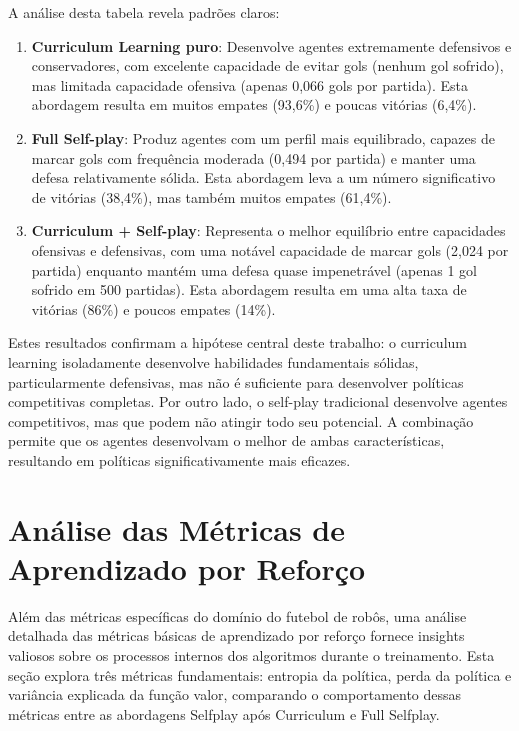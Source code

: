 A análise desta tabela revela padrões claros:

\begin{enumerate}
    \item \textbf{Curriculum Learning puro}: Desenvolve agentes extremamente defensivos e conservadores, com excelente capacidade de evitar gols (nenhum gol sofrido), mas limitada capacidade ofensiva (apenas 0,066 gols por partida). Esta abordagem resulta em muitos empates (93,6\%) e poucas vitórias (6,4\%).
    
    \item \textbf{Full Self-play}: Produz agentes com um perfil mais equilibrado, capazes de marcar gols com frequência moderada (0,494 por partida) e manter uma defesa relativamente sólida. Esta abordagem leva a um número significativo de vitórias (38,4\%), mas também muitos empates (61,4\%).
    
    \item \textbf{Curriculum + Self-play}: Representa o melhor equilíbrio entre capacidades ofensivas e defensivas, com uma notável capacidade de marcar gols (2,024 por partida) enquanto mantém uma defesa quase impenetrável (apenas 1 gol sofrido em 500 partidas). Esta abordagem resulta em uma alta taxa de vitórias (86\%) e poucos empates (14\%).
\end{enumerate}

Estes resultados confirmam a hipótese central deste trabalho: o curriculum learning isoladamente desenvolve habilidades fundamentais sólidas, particularmente defensivas, mas não é suficiente para desenvolver políticas competitivas completas. Por outro lado, o self-play tradicional desenvolve agentes competitivos, mas que podem não atingir todo seu potencial. A combinação permite que os agentes desenvolvam o melhor de ambas características, resultando em políticas significativamente mais eficazes.

\section{Análise das Métricas de Aprendizado por Reforço}
\label{sec:analise_metricas_aprendizado}

Além das métricas específicas do domínio do futebol de robôs, uma análise detalhada das métricas básicas de aprendizado por reforço fornece insights valiosos sobre os processos internos dos algoritmos durante o treinamento. Esta seção explora três métricas fundamentais: entropia da política, perda da política e variância explicada da função valor, comparando o comportamento dessas métricas entre as abordagens Selfplay após Curriculum e Full Selfplay.

